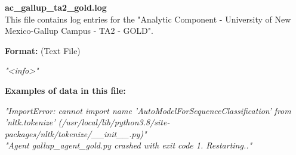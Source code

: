 \begin{description}
\begin{addmargin}[0em]{0em}
    \label{ac_gallup_ta2_gold.log}
    \begin{addmargin}[1em]{0em} %
        \textbf{ac\_gallup\_ta2\_gold.log}\\
        This file contains log entries for the "Analytic Component - University of New Mexico-Gallup Campus - TA2 - GOLD".
        \begin{addmargin}[1em]{0em}
            \textbf{Format:} (Text File)
            \begin{addmargin}[1em]{0em}
                \textit{"<info>"}
            \end{addmargin}
        \end{addmargin}
        \begin{addmargin}[1em]{0em}
            \textbf{Examples of data in this file:}
            \begin{addmargin}[1em]{0em}\textit{"ImportError: cannot import name 'AutoModelForSequenceClassification' from 'nltk.tokenize'
                (/usr/local/lib/python3.8/site-packages/nltk/tokenize/\_\_init\_\_.py)"\\
                "Agent gallup\_agent\_gold.py crashed with exit code 1. Restarting.."}
            \end{addmargin}
        \end{addmargin}
    \end{addmargin} %
    \textbf{\\}


\end{addmargin}
\end{description}
